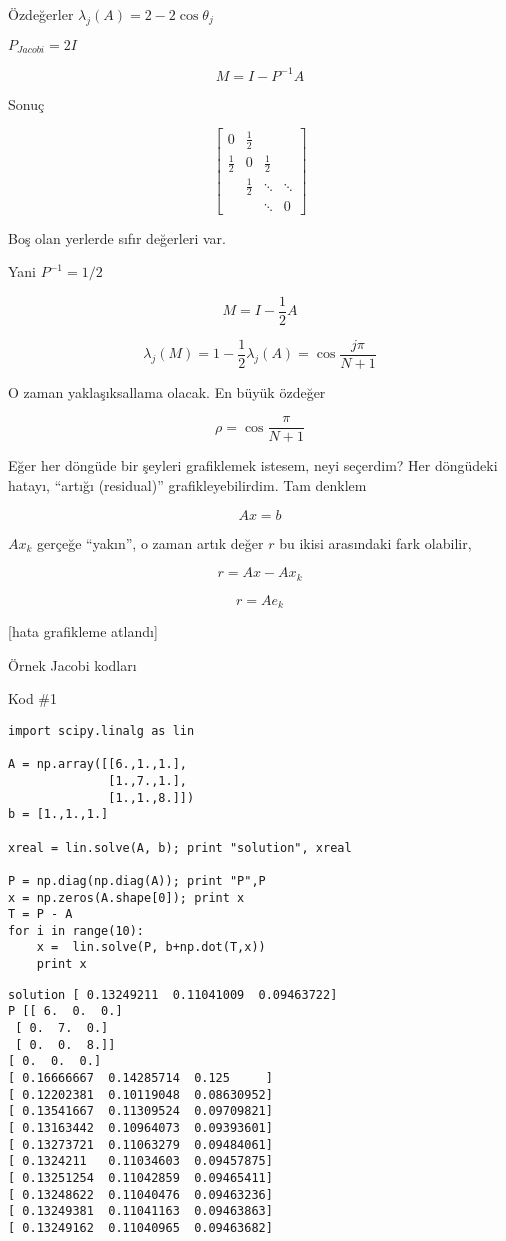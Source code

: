 \documentclass[12pt,fleqn]{article}\usepackage{../../common}
\begin{document}
Özdeğerler $\lambda_j(A) = 2 - 2 \cos\theta_j$

$P_{Jacobi} = 2I$

$$ M = I-P^{-1}A  $$

Sonuç

$$ 
\left[\begin{array}{rrrr}
0 & \frac{ 1}{2} & & \\
\frac{ 1}{2} & 0 & \frac{ 1}{2}& \\
 & \frac{ 1}{2} & \ddots & \ddots \\
 && \ddots & 0
\end{array}\right]
 $$

Boş olan yerlerde sıfır değerleri var. 

Yani $P^{-1} = 1/2$

$$ M = I-\frac{ 1}{2}A  $$

$$ \lambda_j(M) = 1 - \frac{ 1}{2}\lambda_j(A) = \cos \frac{ j\pi}{N+1}$$

O zaman yaklaşıksallama olacak. En büyük özdeğer

$$ \rho = \cos \frac{ \pi}{N+1} $$

Eğer her döngüde bir şeyleri grafiklemek istesem, neyi seçerdim? Her
döngüdeki hatayı, ``artığı (residual)'' grafikleyebilirdim. Tam denklem

$$ Ax = b $$

$Ax_k$ gerçeğe ``yakın'', o zaman artık değer $r$ bu ikisi arasındaki fark
olabilir, 

$$ r = Ax - Ax_k $$

$$ r = Ae_k $$

[hata grafikleme atlandı]

Örnek Jacobi kodları

Kod \#1

\begin{verbatim}
import scipy.linalg as lin

A = np.array([[6.,1.,1.],
              [1.,7.,1.],
              [1.,1.,8.]])
b = [1.,1.,1.]

xreal = lin.solve(A, b); print "solution", xreal

P = np.diag(np.diag(A)); print "P",P
x = np.zeros(A.shape[0]); print x
T = P - A
for i in range(10):
    x =  lin.solve(P, b+np.dot(T,x))
    print x
\end{verbatim}

\begin{verbatim}
solution [ 0.13249211  0.11041009  0.09463722]
P [[ 6.  0.  0.]
 [ 0.  7.  0.]
 [ 0.  0.  8.]]
[ 0.  0.  0.]
[ 0.16666667  0.14285714  0.125     ]
[ 0.12202381  0.10119048  0.08630952]
[ 0.13541667  0.11309524  0.09709821]
[ 0.13163442  0.10964073  0.09393601]
[ 0.13273721  0.11063279  0.09484061]
[ 0.1324211   0.11034603  0.09457875]
[ 0.13251254  0.11042859  0.09465411]
[ 0.13248622  0.11040476  0.09463236]
[ 0.13249381  0.11041163  0.09463863]
[ 0.13249162  0.11040965  0.09463682]
\end{verbatim}
\end{document}
